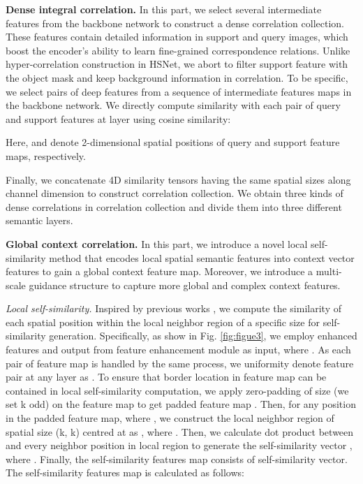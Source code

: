 \documentclass[journal]{IEEEtran}
\begin{document}
\textbf{Dense integral correlation.} In this part, we select several intermediate features from the backbone network to construct a dense correlation collection. These features contain detailed information in support and query images, which boost the encoder's ability to learn fine-grained correspondence relations. Unlike hyper-correlation construction in HSNet, we abort to filter support feature with the object mask and keep background information in correlation. To be specific, we select  pairs of deep features  from a sequence of intermediate features maps in the backbone network. We directly compute similarity with each pair of query and support features at layer  using cosine similarity:

Here,  and  denote 2-dimensional spatial positions of query  and support  feature maps, respectively.   \par

Finally, we concatenate 4D similarity tensors having the same spatial sizes along channel dimension to construct correlation collection. We obtain three kinds of dense correlations in correlation collection and divide them into three different semantic layers. \par

\textbf{Global context correlation.} In this part, we introduce a novel local self-similarity method that encodes local spatial semantic features into context vector features to gain a global context feature map. Moreover, we introduce a multi-scale guidance structure to capture more global and complex context features. \par



\textit{Local self-similarity.} Inspired by previous works \cite{li2020correspondence, huang2019dynamic}, we compute the similarity of each spatial position within the local neighbor region of a specific size for self-similarity generation. Specifically, as show in Fig. \ref{fig:figue3}, we employ enhanced features  and  output from feature enhancement module as input, where . As each pair of feature map is handled by the same process, we uniformity denote feature pair at any layer as . To ensure that border location in feature map can be contained in local self-similarity computation, we apply zero-padding of size  (we set k odd) on the feature map  to get padded feature map . Then, for any position  in the padded feature map, where  , we construct the local neighbor region of spatial size (k, k) centred at  as , where . Then, we calculate dot product between  and every neighbor position in local region  to generate the self-similarity vector , where . Finally, the self-similarity features map  consists of self-similarity vector. The self-similarity features map is calculated as follows:
\end{document}
